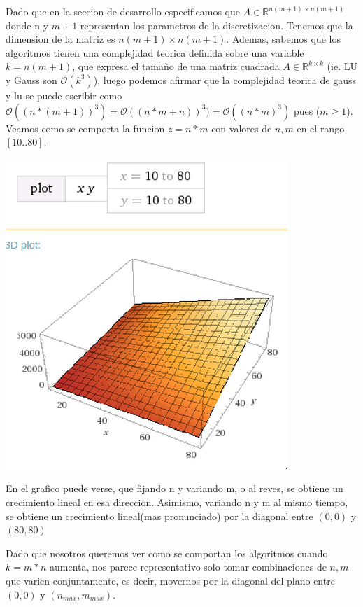  Dado que en la seccion de desarrollo especificamos que $A \in \mathbb{R}^{n(m+1)\times n(m+1)}$ donde n y $m+1$ representan los parametros de la discretizacion. Tenemos que la dimension de la matriz es $n(m+1)\times n(m+1)$. Ademas, sabemos que los algoritmos tienen una complejidad teorica definida sobre una variable $k = n(m+1)$, que expresa el tamaño de una matriz cuadrada $A \in \mathbb{R}^{k\times k}$ (ie. LU y Gauss son $\mathcal{O}(k^3)$), luego podemos afirmar que la complejidad teorica de gauss y lu se puede escribir como $\mathcal{O}((n*(m+1))^3) = \mathcal{O}((n*m + n))^3) = \mathcal{O}((n*m)^3) $ pues ($m\geq1$). \\
 Veamos como se comporta la funcion $z = n*m$ con valores de $n, m$ en el rango $[10..80]$.\\

\begin{center}
\includegraphics[scale=0.65]{img/nTimesM-3dPlot.png}
\end{center}

En el grafico puede verse, que fijando n y variando m, o al reves, se obtiene un crecimiento lineal en esa direccion. Asimismo, variando n y m al mismo tiempo, se obtiene un crecimiento lineal(mas pronunciado) por la diagonal entre $(0,0)$ y $(80,80)$

Dado que nosotros queremos ver como se comportan los algoritmos cuando $k = m*n$ aumenta, nos parece representativo solo tomar combinaciones de $n, m$ que varien conjuntamente, es decir, movernos por la diagonal del plano entre $(0, 0)$ y $(n_{max}, m_{max})$.
\vspace{0.3cm}

